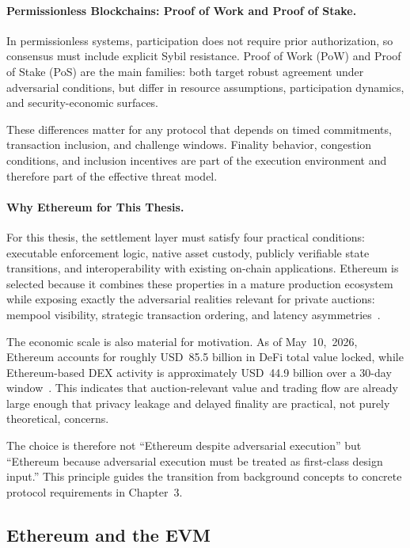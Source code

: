 \documentclass[final,twoside]{vutinfth}
\begin{document}
\paragraph*{Permissionless Blockchains: Proof of Work and Proof of Stake.}
In permissionless systems, participation does not require prior authorization, so consensus must include explicit Sybil resistance. Proof of Work (PoW) and Proof of Stake (PoS) are the main families: both target robust agreement under adversarial conditions, but differ in resource assumptions, participation dynamics, and security-economic surfaces.

These differences matter for any protocol that depends on timed commitments, transaction inclusion, and challenge windows. Finality behavior, congestion conditions, and inclusion incentives are part of the execution environment and therefore part of the effective threat model.

\paragraph*{Why Ethereum for This Thesis.}
For this thesis, the settlement layer must satisfy four practical conditions: executable enforcement logic, native asset custody, publicly verifiable state transitions, and interoperability with existing on-chain applications. Ethereum is selected because it combines these properties in a mature production ecosystem while exposing exactly the adversarial realities relevant for private auctions: mempool visibility, strategic transaction ordering, and latency asymmetries~\cite{Wood2025Ethereum,Daian2019FlashBoys,Qin2022MEV}.

The economic scale is also material for motivation. As of May~10,~2026, Ethereum accounts for roughly USD~85.5 billion in DeFi total value locked, while Ethereum-based DEX activity is approximately USD~44.9 billion over a 30-day window~\cite{DefiLlamaEthereumChain2026,DefiLlamaEthereumDexVolume2026}. This indicates that auction-relevant value and trading flow are already large enough that privacy leakage and delayed finality are practical, not purely theoretical, concerns.

The choice is therefore not ``Ethereum despite adversarial execution'' but ``Ethereum because adversarial execution must be treated as first-class design input.'' This principle guides the transition from background concepts to concrete protocol requirements in Chapter~3.

\subsection{Ethereum and the EVM}
\end{document}
